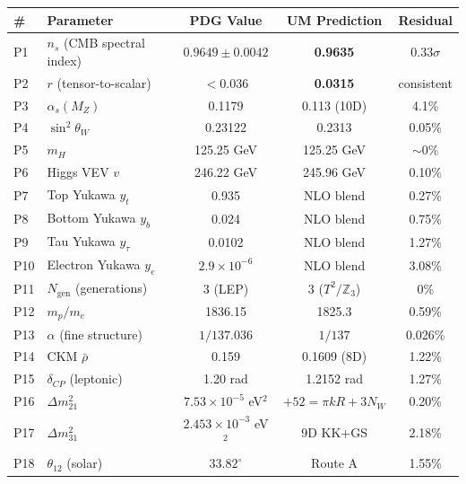 \documentclass[12pt,a4paper]{article}
\begin{document}
\begin{table}[h]
\centering
\small
\begin{tabular}{llccc}
\hline
\# & Parameter & PDG Value & UM Prediction & Residual \\
\hline
P1  & $n_s$ (CMB spectral index)      & $0.9649 \pm 0.0042$ & \textbf{0.9635} & $0.33\sigma$ \\
P2  & $r$ (tensor-to-scalar)          & $< 0.036$            & \textbf{0.0315} & consistent \\
P3  & $\alpha_s(M_Z)$                 & 0.1179               & 0.113 (10D)     & 4.1\% \\
P4  & $\sin^2\theta_W$                & 0.23122              & 0.2313          & 0.05\% \\
P5  & $m_H$                           & 125.25 GeV           & 125.25 GeV      & $\sim0$\% \\
P6  & Higgs VEV $v$                   & 246.22 GeV           & 245.96 GeV      & 0.10\% \\
P7  & Top Yukawa $y_t$                & 0.935                & NLO blend       & 0.27\% \\
P8  & Bottom Yukawa $y_b$             & 0.024                & NLO blend       & 0.75\% \\
P9  & Tau Yukawa $y_\tau$             & 0.0102               & NLO blend       & 1.27\% \\
P10 & Electron Yukawa $y_e$           & $2.9 \times 10^{-6}$ & NLO blend       & 3.08\% \\
P11 & $N_\mathrm{gen}$ (generations)  & 3 (LEP)              & 3 ($T^2/\mathbb{Z}_3$) & 0\% \\
P12 & $m_p/m_e$                       & 1836.15              & 1825.3          & 0.59\% \\
P13 & $\alpha$ (fine structure)       & $1/137.036$          & $1/137$         & 0.026\% \\
P14 & CKM $\bar\rho$                  & 0.159                & 0.1609 (8D)     & 1.22\% \\
P15 & $\delta_{CP}$ (leptonic)        & 1.20 rad             & 1.2152 rad      & 1.27\% \\
P16 & $\Delta m^2_{21}$               & $7.53\times10^{-5}$ eV$^2$ & $+52 = \pi kR + 3N_W$ & 0.20\% \\
P17 & $\Delta m^2_{31}$               & $2.453\times10^{-3}$ eV$^2$ & 9D KK+GS  & 2.18\% \\
P18 & $\theta_{12}$ (solar)           & $33.82^\circ$        & Route A         & 1.55\% \\

\end{tabular}
\end{table}
\end{document}
